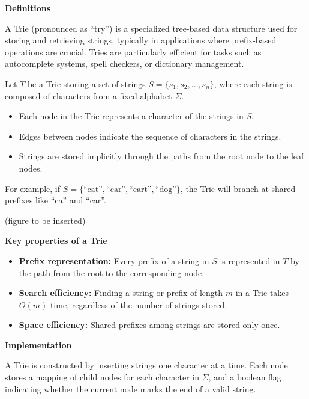 \begin{tcolorbox}[colframe = blue, title={Reference Reading}, colback = white, enhanced, breakable, 
    skin first=enhanced,
    skin middle=enhanced,
    skin last=enhanced,
    before upper={\parindent15pt}]

\noindent\textbf{Definitions}

A Trie (pronounced as ``try'') is a specialized tree-based data structure used for storing and retrieving strings, typically in applications where prefix-based operations are crucial. Tries are particularly efficient for tasks such as autocomplete systems, spell checkers, or dictionary management.

Let $T$ be a Trie storing a set of strings $S = \{s_1, s_2, \ldots, s_n\}$, where each string is composed of characters from a fixed alphabet $\Sigma$. 
\begin{itemize}
    \item Each node in the Trie represents a character of the strings in $S$.
    \item Edges between nodes indicate the sequence of characters in the strings.
    \item Strings are stored implicitly through the paths from the root node to the leaf nodes.
\end{itemize}

For example, if $S = \{\text{``cat''}, \text{``car''}, \text{``cart''}, \text{``dog''}\}$, the Trie will branch at shared prefixes like ``ca'' and ``car''.

(figure to be inserted)

\noindent\textbf{Key properties of a Trie}

\begin{itemize}
    \item \textbf{Prefix representation:} Every prefix of a string in $S$ is represented in $T$ by the path from the root to the corresponding node.
    \item \textbf{Search efficiency:} Finding a string or prefix of length $m$ in a Trie takes $O(m)$ time, regardless of the number of strings stored.
    \item \textbf{Space efficiency:} Shared prefixes among strings are stored only once.
\end{itemize}

\noindent\textbf{Implementation}

A Trie is constructed by inserting strings one character at a time. Each node stores a mapping of child nodes for each character in $\Sigma$, and a boolean flag indicating whether the current node marks the end of a valid string. 


\end{tcolorbox}
